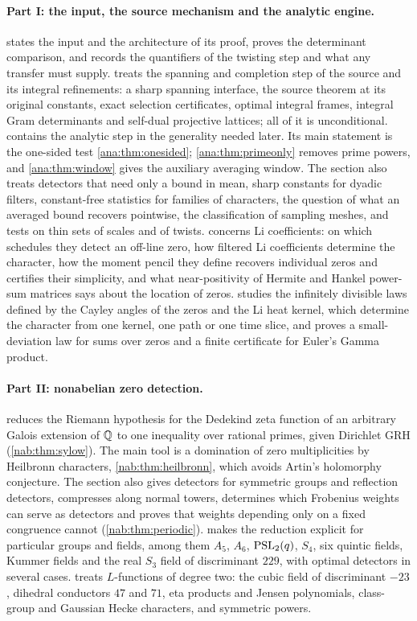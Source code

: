 \paragraph{Part I: the input, the source mechanism and the analytic engine.}
 states the input and the architecture of its proof, proves the determinant
comparison, and records the quantifiers of the twisting step and what any transfer must supply.
 treats the spanning and completion step of the source and its integral
refinements: a sharp spanning interface, the source theorem at its original constants, exact
selection certificates, optimal integral frames, integral Gram determinants and self-dual
projective lattices; all of it is unconditional.  contains the analytic step
in the generality needed later. Its main statement is the one-sided test
\cref{ana:thm:onesided}; \cref{ana:thm:primeonly} removes prime powers, and
\cref{ana:thm:window} gives the auxiliary averaging window. The section also treats
detectors that need only a bound in mean, sharp constants for dyadic filters, constant-free
statistics for families of characters, the question of what an averaged bound recovers
pointwise, the classification of sampling meshes, and tests on thin sets of scales and of
twists.  concerns Li coefficients: on which schedules they detect an off-line
zero, how filtered Li coefficients determine the character, how the moment pencil they define
recovers individual zeros and certifies their simplicity, and what near-positivity of Hermite
and Hankel power-sum matrices says about the location of zeros.  studies the
infinitely divisible laws defined by the Cayley angles of the zeros and the Li heat kernel,
which determine the character from one kernel, one path or one time slice, and proves a
small-deviation law for sums over zeros and a finite certificate for Euler's Gamma product.

\paragraph{Part II: nonabelian zero detection.}
 reduces the Riemann hypothesis for the Dedekind zeta function of an arbitrary
Galois extension of $\mathbb{Q}$ to one inequality over rational primes, given Dirichlet GRH
(\cref{nab:thm:sylow}). The main tool is a domination of zero multiplicities by Heilbronn
characters, \cref{nab:thm:heilbronn}, which avoids Artin's holomorphy conjecture. The section
also gives detectors for symmetric groups and reflection detectors, compresses along normal
towers, determines which Frobenius weights can serve as detectors and proves that weights
depending only on a fixed congruence cannot (\cref{nab:thm:periodic}).  makes
the reduction explicit for particular groups and fields, among them $A_5$, $A_6$, $\operatorname{PSL}_2(q)$,
$S_4$, six quintic fields, Kummer fields and the real $S_3$ field of discriminant $229$, with
optimal detectors in several cases.  treats $L$-functions of degree two: the
cubic field of discriminant $-23$, dihedral conductors $47$ and $71$, eta products and Jensen
polynomials, class-group and Gaussian Hecke characters, and symmetric powers.

